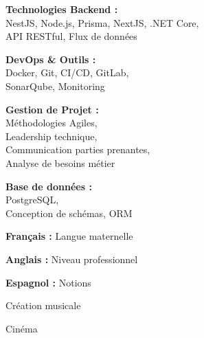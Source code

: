 \documentclass[a4paper,11pt]{article}
\begin{document}
\begin{cv}[profile][2]
    \cvseparator[2]
    \begin{cvitem}
        \textbf{Technologies Backend :} \\
        NestJS, Node.js, Prisma, NextJS, .NET Core, \\
        API RESTful, Flux de données
    \end{cvitem}

    \cvseparator[2]
    \begin{cvitem}
        \textbf{DevOps \& Outils :} \\
        Docker, Git, CI/CD, GitLab, \\
        SonarQube, Monitoring
    \end{cvitem}

    \cvseparator[2]
    \begin{cvitem}
        \textbf{Gestion de Projet :} \\
        Méthodologies Agiles, \\
        Leadership technique, \\
        Communication parties prenantes, \\
        Analyse de besoins métier
    \end{cvitem}

    \cvseparator[2]
    \begin{cvitem}
        \textbf{Base de données :} \\
        PostgreSQL, \\
        Conception de schémas, ORM
    \end{cvitem}

\begin{cvitem}
    \textbf{Français :} Langue maternelle
\end{cvitem}

\cvseparator
\begin{cvitem}
    \textbf{Anglais :} Niveau professionnel
\end{cvitem}

\cvseparator
\begin{cvitem}
    \textbf{Espagnol :} Notions
\end{cvitem}

\begin{cvitem}
    Création musicale
\end{cvitem}

\cvseparator
\begin{cvitem}
    Cinéma
\end{cvitem}


\end{cv}
\end{document}
